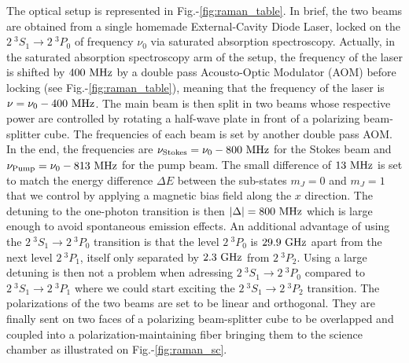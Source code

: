 The optical setup is represented in Fig.-\ref{fig:raman_table}. In brief, the two beams are obtained from a single homemade External-Cavity Diode Laser, locked on the $2 \ ^3 S_1 \rightarrow 2 \ ^3 P_0$ of frequency $\nu_0$ via saturated absorption spectroscopy. Actually, in the saturated absorption spectroscopy arm of the setup, the frequency of the laser is shifted by $400 \ \rm{MHz}$ by a double pass Acousto-Optic Modulator (AOM) before locking (see Fig.-\ref{fig:raman_table}), meaning that the frequency of the laser is $\nu = \nu_0 - 400 \ \rm{MHz}$. The main beam is then split in two beams whose respective power are controlled by rotating a half-wave plate in front of a polarizing beam-splitter cube. The frequencies of each beam is set by another double pass AOM. In the end, the frequencies are $\nu_{\rm{Stokes}} = \nu_0 - 800 \ \rm{MHz}$ for the Stokes beam and $\nu_{\rm{Pump}} = \nu_0 - 813 \ \rm{MHz}$ for the pump beam. The small difference of $13 \ \rm{MHz}$ is set to match the energy difference $\Delta E$ between the sub-states $m_J=0$ and $m_J=1$ that we control by applying a magnetic bias field along the $x$ direction. The detuning to the one-photon transition is then $|\Delta|=800 \ \rm{MHz}$ which is large enough to avoid spontaneous emission effects. An additional advantage of using the $2 \ ^3 S_1 \rightarrow 2 \ ^3 P_0$ transition is that the level $2 \ ^3 P_0$ is $29.9 \ \rm{GHz}$ apart from the next level $2 \ ^3 P_1$, itself only separated by $2.3 \ \rm{GHz}$ from $2 \ ^3 P_2$. Using a large detuning is then not a problem when adressing $2 \ ^3 S_1 \rightarrow 2 \ ^3 P_0$ compared to $2 \ ^3 S_1 \rightarrow 2 \ ^3 P_1$ where we could start exciting the $2 \ ^3 S_1 \rightarrow 2 \ ^3 P_2$ transition.
The polarizations of the two beams are set to be linear and orthogonal. They are finally sent on two faces of a polarizing beam-splitter cube to be overlapped and coupled into a polarization-maintaining fiber bringing them to the science chamber as illustrated on Fig.-\ref{fig:raman_sc}.

